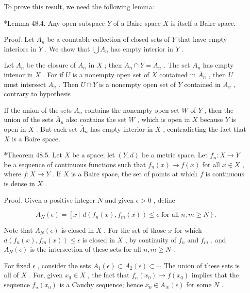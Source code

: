 \documentclass[10pt]{article}
\begin{document}
To prove this result, we need the following lemma:

*Lemma 48.4. Any open subspace \(Y\) of a Baire space \(X\) is itself a Baire space.

Proof. Let \({A}_{n}\) be a countable collection of closed sets of \(Y\) that have empty interiors in \(Y\) . We show that \(\bigcup {A}_{n}\) has empty interior in \(Y\) .

Let \({\bar{A}}_{n}\) be the closure of \({A}_{n}\) in \(X\) ; then \({\bar{A}}_{n} \cap  Y = {A}_{n}\) . The set \({\bar{A}}_{n}\) has empty intenor in \(X\) . For if \(U\) is a nonempty open set of \(X\) contained in \({\bar{A}}_{n}\) , then \(U\) must intersect \({A}_{n}\) . Then \(U \cap  Y\) is a nonempty open set of \(Y\) contained in \({A}_{n}\) , contrary to hypothesis

If the union of the sets \({A}_{n}\) contains the nonempty open set \(W\) of \(Y\) , then the union of the sets \({\bar{A}}_{n}\) also contains the set \(W\) , which is open in \(X\) because \(Y\) is open in \(X\) . But each set \({\bar{A}}_{n}\) has empty interior in \(X\) , contradicting the fact that \(X\) is a Baire space.

*Theorem 48.5. Let \(X\) be a space; let \(\left( {Y,d}\right)\) be a metric space. Let \({f}_{n} : X \rightarrow  Y\) be a sequence of continuous functions such that \({f}_{n}\left( x\right)  \rightarrow  f\left( x\right)\) for all \(x \in  X\) , where \(f : X \rightarrow  Y\) . If \(X\) is a Baire space, the set of points at which \(f\) is continuous is dense in \(X\) .

Proof. Given a positive integer \(N\) and given \(\epsilon  > 0\) , define

\[
{A}_{N}\left( \epsilon \right)  = \left\lbrack  {x \mid  d\left( {{f}_{n}\left( x\right) ,{f}_{m}\left( x\right) }\right)  \leq  \epsilon }\right. \text{ for all }\left. {n,m \geq  N}\right\}  .
\]

Note that \({A}_{N}\left( \epsilon \right)\) is closed in \(X\) . For the set of those \(x\) for which \(d\left( {{f}_{n}\left( x\right) ,{f}_{m}\left( x\right) }\right)  \leq  \epsilon\) is closed in \(X\) , by continuity of \({f}_{n}\) and \({f}_{m}\) , and \({A}_{N}\left( \epsilon \right)\) is the intersection of these sets for all \(n,m \geq  N\) .

For fixed \(\epsilon\) , consider the sets \({A}_{1}\left( \epsilon \right)  \subset  {A}_{2}\left( \epsilon \right)  \subset  \cdots\) The union of these sets is all of \(X\) . For, given \({x}_{0} \in  X\) , the fact that \({f}_{n}\left( {x}_{0}\right)  \rightarrow  f\left( {x}_{0}\right)\) implies that the sequence \({f}_{n}\left( {x}_{0}\right)\) is a Cauchy sequence; hence \({x}_{0} \in  {A}_{N}\left( \epsilon \right)\) for some \(N\) .
\end{document}
